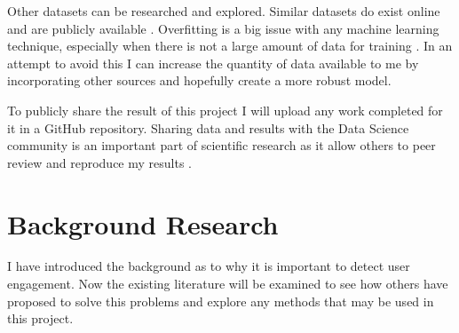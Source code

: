 \documentclass{article}
\begin{document}
Other datasets can be researched and explored.
Similar datasets do exist online and are publicly available \cite{kaggleWorkerActivity}.
Overfitting is a big issue with any machine learning technique, especially when there is not a large amount of data for training \cite{dietterich1995overfitting}.
In an attempt to avoid this I can increase the quantity of data available to me by incorporating other sources and hopefully create a more robust model.



To publicly share the result of this project I will upload any work completed for it in a GitHub repository.
Sharing data and results with the Data Science community is an important part of scientific research as it allow others to peer review and reproduce my results \cite{Birnholtz2003data}.



\section{Background Research}


I have introduced the background as to why it is important to detect user engagement.
Now the existing literature will be examined to see how others have proposed to solve this problems and explore any methods that may be used in this project.
\end{document}
